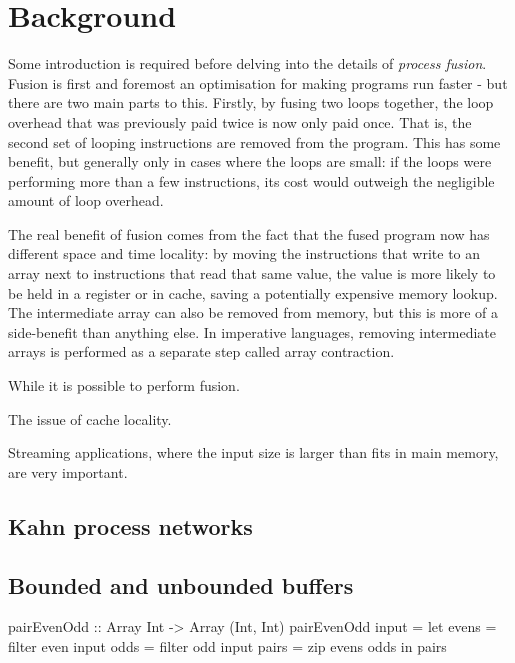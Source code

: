 \chapter{Background}
\label{chapter:process:background}

Some introduction is required before delving into the details of \emph{process fusion}.
Fusion is first and foremost an optimisation for making programs run faster - but there are two main parts to this.
Firstly, by fusing two loops together, the loop overhead that was previously paid twice is now only paid once.
That is, the second set of looping instructions are removed from the program.
This has some benefit, but generally only in cases where the loops are small: if the loops were performing more than a few instructions, its cost would outweigh the negligible amount of loop overhead.

The real benefit of fusion comes from the fact that the fused program now has different space and time locality: by moving the instructions that write to an array next to instructions that read that same value, the value is more likely to be held in a register or in cache, saving a potentially expensive memory lookup.
The intermediate array can also be removed from memory, but this is more of a side-benefit than anything else.
In imperative languages, removing intermediate arrays is performed as a separate step called array contraction.

While it is possible to perform fusion.

The issue of cache locality.

Streaming applications, where the input size is larger than fits in main memory, are very important.

\section{Kahn process networks}


\section{Bounded and unbounded buffers}

\begin{code}
pairEvenOdd :: Array Int -> Array (Int, Int)
pairEvenOdd input
 = let evens = filter even input
       odds  = filter odd  input
       pairs = zip evens odds
   in  pairs
\end{code}

